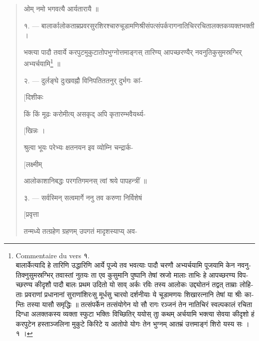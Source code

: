 \documentclass[a4paper, 11pt, oneside, french, landscape, twocolumn]{article}
\begin{document}
\bigskip
\begin{quotation}\footnotesize
\texthindi{ओम् नमो भगवत्यै आर्यतारायै ॥}

\bigskip

\texthindi{१}. --- \texthindi{बालार्कालोकताम्रप्रवरसुरशिरश्चारुचूडामणिश्रीसंपत्संपर्करागनातिचिररचितालक्तकव्यक्तभक्ती ।}

\texthindi{भक्त्या पादौ तवार्ये करपुटमुकुटातोपभुग्नोत्तमाङ्गस् तारिण्य् आपच्छरण्यैर् नवनुतिकुसुमस्रग्भिर् अभ्यर्चयामि\footnote{Commentaire du vers \texthindi{१}.\\\hspace*{5mm}\texthindi{बालार्केत्यादि हे तारिणि उद्धारिणि आर्ये पूज्ये तव भवत्याः पादौ चरणौ अभ्यर्चयामि पूजयामि केन नवनुतिक्नुसुमस्रग्भिर् तवास्तां नुतयः ता एव कुसुमानि पुष्पानि तेषां स्रजो मालाः ताभिः हे आपच्छरण्य विपच्छरण्य कीदृशौ पादौ बालः प्रथम उदितो यो साव् अर्कः रविः तस्य आलोकः उद्द्योतनं तद्वत् ताम्राः लोहिताः प्रवराणां प्रधानानां सुराणांशिरःसु मूर्धसु चारवो दर्शनीयाः ये चूडामणयः शिखारत्नानि तेषां या श्रीः कान्तिः तस्या यासौ समृद्धिः ॥ तत्संपर्केन तत्संयोगेन यो सौ रागः रञ्जनं तेन नातिचिरं स्वल्पकालं रचिता दिग्धा अलक्तकस्य व्यक्ता स्फुटा भक्तिः विच्छितिर् ययोस् ताु कथम् अर्चयामि भक्त्या सेवया कीदृशो हं करपुटेन हस्ताञ्जलिना मुकुटे किरिटे य आतोपो योगः तेन भुग्नम् आतम्रं उत्तमाङ्गं शिरो यस्य सः । १ ।}} ॥}

\bigskip

\texthindi{२}. --- \texthindi{दुर्लङ्घे दुःखवह्नौ विनिपतिततनुर् दुर्भगः कां-}

\hspace*{55mm}\texthindi{[दिशीकः}

\texthindi{किं किं मूढः करोमीत्य् असकृद् अपि कृतारम्भवैयर्थ्य-}

\hspace*{55mm}\texthindi{[खिन्नः ।}

\texthindi{श्रुत्वा भूयः परेभ्यः क्षतनयन इव व्योम्नि चन्द्रार्क-}

\hspace*{55mm}\texthindi{[लक्ष्मीम्}

\texthindi{आलोकाशानिबद्धः परगतिगमनस् त्वां श्रये पापहन्त्रीं ॥}

\bigskip

\texthindi{३}. --- \texthindi{सर्वस्मिन् सत्वमार्गे ननु तव करुणा निर्विशेषं}

\hspace*{55mm}\texthindi{[प्रवृत्ता}

\texthindi{तन्मध्ये तत्ग्रहेण ग्रहणम् उपगतं मादृशस्याप्य् अव-}


\end{quotation}
\end{document}

